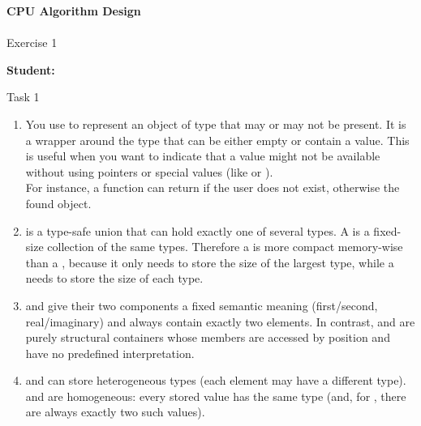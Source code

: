





\begin{Large}
    \textsf{\textbf{CPU Algorithm Design}} \\
    \\
    Exercise 1
\end{Large}
\vspace{1ex}
\textsf{\textbf{Student:}}  \\
\vspace{2ex}

\begin{problem}{}{Task 1}
    \begin{enumerate}[(1)]
        \item 
            You use  to represent an object of type  that may or may not be present. 
            It is a wrapper around the type  that can be either empty or contain a value. 
            This is useful when you want to indicate that a value might not be available without using pointers or special 
            values (like  or ). \\
            For instance, a  function can return 
            if the user does not exist, otherwise the found  object.
        \item 
             is a type-safe union that can hold exactly one of several types. 
            A  is a fixed-size collection of the same types.
            Therefore a  is more compact memory-wise than a , 
            because it only needs to store the size of the largest type, while a  
            needs to store the size of each type.
        \item  
             and  give their two
            components a fixed semantic meaning (first/second,
            real/imaginary) and always contain exactly two elements.  
            In contrast,  and  are
            purely structural containers whose members are accessed by
            position and have no predefined interpretation.

        \item  
             and  can store
            heterogeneous types (each element may have a different
            type).  
             and 
            are homogeneous: every stored value has the same type
             (and, for , there are always
            exactly two such values).


\end{enumerate}
\end{problem}

